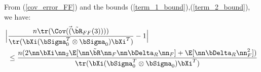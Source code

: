 \begin{IEEEproof}
%
%
%
%
From (\ref{cov_error_FF}) and the bounds (\ref{term_1_bound}),(\ref{term_2_bound}), we have:
\begin{align}
	\Big| & \frac{n \tr(\Cov(\vec(\tilde{\bR}_{FF}(3))))}{\tr(\bXi(\bSigma_0^T\otimes \bSigma_0)\bXi^T)} - 1 \Big| \nonumber \\
		&\leq \frac{n(2\nn\bXi \nn_2 \E[\nn \tilde{\bR} \nn_F\nn \bDelta_R\nn_F] + \E[\nn \bDelta_R\nn_F^2])}{\tr(\bXi(\bSigma_0^T\otimes \bSigma_0)\bXi^T)} \nonumber \\

\end{align}
\end{IEEEproof}
